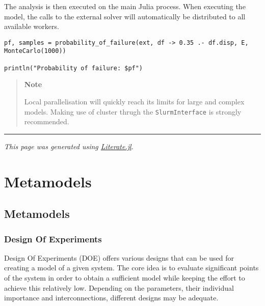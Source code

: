 The analysis is then executed on the main Julia process. When executing the model, the calls to the external solver will automatically be distributed to all available workers.




\begin{verbatim}
pf, samples = probability_of_failure(ext, df -> 0.35 .- df.disp, E, MonteCarlo(1000))

println("Probability of failure: $pf")
\end{verbatim}



\begin{quote}
\textbf{Note}

Local parallelisation will quickly reach it{\textquotesingle}s limits for large and complex models. Making use of  cluster thrugh the \texttt{SlurmInterface} is strongly recommended.

\end{quote}


{\rule{\textwidth}{1pt}}


\emph{This page was generated using \href{https://github.com/fredrikekre/Literate.jl}{Literate.jl}.}



\chapter{Metamodels}


\section{Metamodels}



\label{13382004127081062345}{}


\subsection{Design Of Experiments}



\label{5141534247305030192}{}


Design Of Experiments (DOE) offers various designs that can be used for creating a model of a given system. The core idea is to evaluate significant points of the system in order to obtain a sufficient model while keeping the effort to achieve this relatively low. Depending on the parameters, their individual importance and interconnections, different designs may be adequate.



